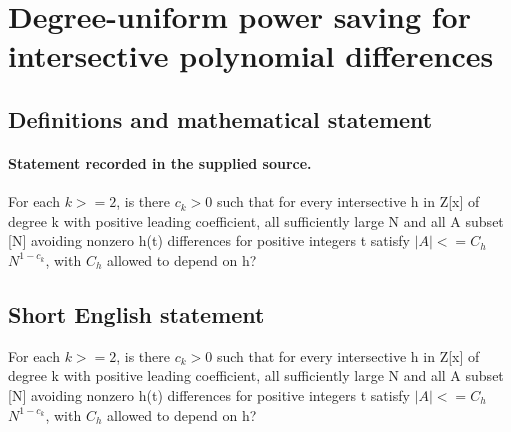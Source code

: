 \documentclass[11pt]{article}
\begin{document}
\section*{Degree-uniform power saving for intersective polynomial differences}\label{30007096}
\subsection{Definitions and mathematical statement}
\paragraph{Statement recorded in the supplied source.}
For each $k>=2$, is there $c_k>0$ such that for every intersective h in Z[x] of degree k with positive leading coefficient, all sufficiently large N and all A subset [N] avoiding nonzero h(t) differences for positive integers t satisfy $|A|<=C_h$ $N^{1-c_k}$, with $C_h$ allowed to depend on h?
\subsection{Short English statement}
For each $k>=2$, is there $c_k>0$ such that for every intersective h in Z[x] of degree k with positive leading coefficient, all sufficiently large N and all A subset [N] avoiding nonzero h(t) differences for positive integers t satisfy $|A|<=C_h$ $N^{1-c_k}$, with $C_h$ allowed to depend on h?
\end{document}
